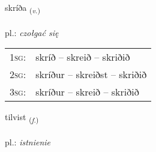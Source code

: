 \documentclass[frontgrid, backgrid]{flacards}\usepackage[]{graphicx}\usepackage[]{xcolor}
\begin{document}
\renewcommand{\blhead}{\vskip5pt {\small\bfseries\footnotesize Sagnorð | czasownik }}
\renewcommand{\bcfoot}{\vskip5pt \hspace{2pt}{\small\bfseries\footnotesize 3K}}


{skríða \small{\textsubscript{(\textit{v.})}} \\[1ex] %
\textphonetic{[skriːða]} \\
pl.: \emph{czołgać się} \\  [2ex]
\renewcommand*{\arraystretch}{0.8}
\begin{tabular}{p{1cm}l}
\textsc{1sg}: & skríð -- skreið -- skriðið \\ 
\textsc{2sg}: & skríður -- skreiðst -- skriðið \\ 
\textsc{3sg}: & skríður -- skreið -- skriðið \\ 
\end{tabular}
}

\renewcommand{\flhead}{\vskip5pt \fboxsep=0pt {\small\bfseries\footnotesize Nafnorð | rzeczownik}}
\renewcommand{\fcfoot}{\vskip5pt \fboxsep=0pt \hspace{2pt}{\small\bfseries\footnotesize 3K}}

\renewcommand{\blhead}{\vskip5pt {\small\bfseries\footnotesize Nafnorð | rzeczownik }}
\renewcommand{\bcfoot}{\vskip5pt \hspace{2pt}{\small\bfseries\footnotesize 3K}}


{tilvist \small{\textsubscript{(\textit{f.})}} \\[1ex] %
\textphonetic{[tʰɪlvɪst]} \\
pl.: \emph{istnienie} \\  [2ex]
\renewcommand*{\arraystretch}{0.8}
}
\end{document}
